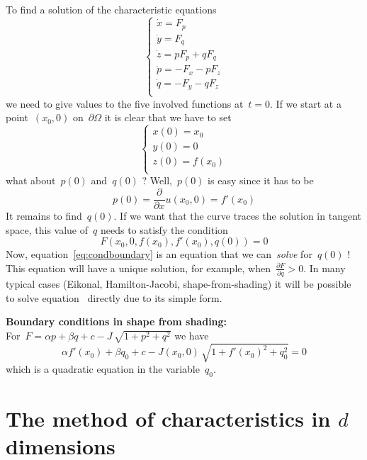 To find a solution of the characteristic equations
\begin{equation*}
	\begin{cases}
		\dot x = F_p \\
		\dot y = F_q \\
		\dot z = pF_p + qF_q \\
		\dot p = -F_x - pF_z \\
		\dot q = -F_y - qF_z \\
	\end{cases}
\end{equation*}
we need to give values to the five involved functions at~$t=0$.
If we start at a point~$(x_0,0)$ on~$\partial\Omega$ it is clear that
we have to set
\begin{equation*}
	\begin{cases}
		x(0) = x_0 \\
		y(0) = 0 \\
		z(0) = f(x_0) \\
	\end{cases}
\end{equation*}
what about~$p(0)$ and~$q(0)$ ?
Well,~$p(0)$ is easy since it has to be
\[
	p(0) = \frac{\partial}{\partial x}u(x_0,0) = f'(x_0)
\]
It remains to find~$q(0)$.  If we want that the curve traces the solution in
tangent space, this value of~$q$ needs to satisfy the condition
\begin{equation}\label{eq:condboundary}
	F(x_0, 0, f(x_0), f'(x_0), q(0)) = 0
\end{equation}
Now, equation~\ref{eq:condboundary} is an equation that we can~\emph{solve}
for~$q(0)$ !
This equation will have a unique solution, for example, when~$\frac{\partial
F}{\partial q}>0$.  In many typical cases (Eikonal, Hamilton-Jacobi,
shape-from-shading) it will be possible to solve
equation~\label{eq:condboundary} directly due to its simple form.

{\bf Boundary conditions in shape from shading:}\\
For~$F=\alpha p + \beta q + c - J\,\sqrt{1+p^2+q^2}$
we have
\[
	\alpha f'(x_0) + \beta q_0 + c
	-J(x_0,0)\, \sqrt{1+f'(x_0)^2+q_0^2} = 0
\]
which is a quadratic equation in the variable~$q_0$.



\clearpage
\section{The method of characteristics in $d$ dimensions}

